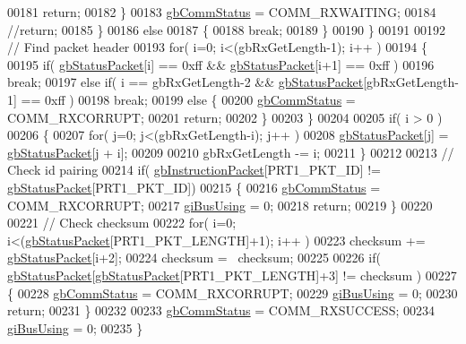 \begin{DoxyCode}
00181                 \textcolor{keywordflow}{return};
00182             \}
00183             \hyperlink{a00003_a5b603f6bed7ccc595f1f50bd6a6ebbfc}{gbCommStatus} = COMM\_RXWAITING;
00184             \textcolor{comment}{//return;           }
00185         \}
00186         \textcolor{keywordflow}{else}
00187         \{
00188             \textcolor{keywordflow}{break};
00189         \}
00190     \}
00191 
00192     \textcolor{comment}{// Find packet header}
00193     \textcolor{keywordflow}{for}( i=0; i<(gbRxGetLength-1); i++ )
00194     \{
00195         \textcolor{keywordflow}{if}( \hyperlink{a00003_aa57c86d3bbbeaf5c9d4f6bd00376b04f}{gbStatusPacket}[i] == 0xff && \hyperlink{a00003_aa57c86d3bbbeaf5c9d4f6bd00376b04f}{gbStatusPacket}[i+1] == 0xff )
00196             \textcolor{keywordflow}{break};
00197         \textcolor{keywordflow}{else} \textcolor{keywordflow}{if}( i == gbRxGetLength-2 && \hyperlink{a00003_aa57c86d3bbbeaf5c9d4f6bd00376b04f}{gbStatusPacket}[gbRxGetLength-1] == 0xff )
00198             \textcolor{keywordflow}{break};
00199         \textcolor{keywordflow}{else} \{
00200             \hyperlink{a00003_a5b603f6bed7ccc595f1f50bd6a6ebbfc}{gbCommStatus} = COMM\_RXCORRUPT;
00201             \textcolor{keywordflow}{return};
00202         \}
00203     \}
00204 
00205     \textcolor{keywordflow}{if}( i > 0 )
00206     \{
00207         \textcolor{keywordflow}{for}( j=0; j<(gbRxGetLength-i); j++ )
00208             \hyperlink{a00003_aa57c86d3bbbeaf5c9d4f6bd00376b04f}{gbStatusPacket}[j] = \hyperlink{a00003_aa57c86d3bbbeaf5c9d4f6bd00376b04f}{gbStatusPacket}[j + i];
00209             
00210         gbRxGetLength -= i;     
00211     \}
00212 
00213     \textcolor{comment}{// Check id pairing}
00214     \textcolor{keywordflow}{if}( \hyperlink{a00003_afd94dcf01b8e96298727776e222de722}{gbInstructionPacket}[PRT1\_PKT\_ID] != \hyperlink{a00003_aa57c86d3bbbeaf5c9d4f6bd00376b04f}{gbStatusPacket}[PRT1\_PKT\_ID])
00215     \{
00216         \hyperlink{a00003_a5b603f6bed7ccc595f1f50bd6a6ebbfc}{gbCommStatus} = COMM\_RXCORRUPT;
00217         \hyperlink{a00003_ad10e0e49f5fef04bf789a89c14cc470a}{giBusUsing} = 0;
00218         \textcolor{keywordflow}{return};
00219     \}
00220     
00221     \textcolor{comment}{// Check checksum}
00222     \textcolor{keywordflow}{for}( i=0; i<(\hyperlink{a00003_aa57c86d3bbbeaf5c9d4f6bd00376b04f}{gbStatusPacket}[PRT1\_PKT\_LENGTH]+1); i++ )
00223         checksum += \hyperlink{a00003_aa57c86d3bbbeaf5c9d4f6bd00376b04f}{gbStatusPacket}[i+2];
00224     checksum = ~checksum;
00225 
00226     \textcolor{keywordflow}{if}( \hyperlink{a00003_aa57c86d3bbbeaf5c9d4f6bd00376b04f}{gbStatusPacket}[\hyperlink{a00003_aa57c86d3bbbeaf5c9d4f6bd00376b04f}{gbStatusPacket}[PRT1\_PKT\_LENGTH]+3] != checksum )
00227     \{
00228         \hyperlink{a00003_a5b603f6bed7ccc595f1f50bd6a6ebbfc}{gbCommStatus} = COMM\_RXCORRUPT;
00229         \hyperlink{a00003_ad10e0e49f5fef04bf789a89c14cc470a}{giBusUsing} = 0;
00230         \textcolor{keywordflow}{return};
00231     \}
00232     
00233     \hyperlink{a00003_a5b603f6bed7ccc595f1f50bd6a6ebbfc}{gbCommStatus} = COMM\_RXSUCCESS;
00234     \hyperlink{a00003_ad10e0e49f5fef04bf789a89c14cc470a}{giBusUsing} = 0;
00235 \}
\end{DoxyCode}
